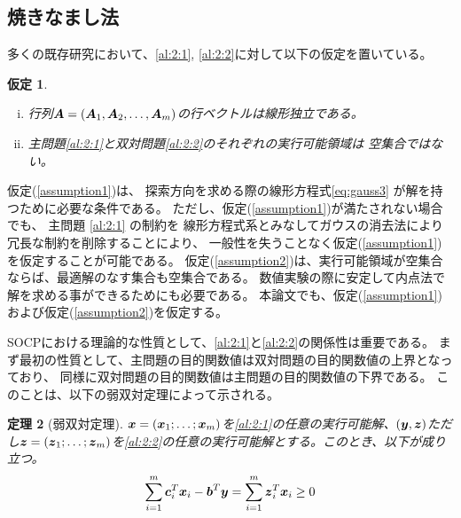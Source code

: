 \documentclass[11pt,a4paper,dvipdfmx,titlepage,uplatex]{jsarticle}
\theoremstyle{mystyle}
\newcommand{\0}{\mathbf{0}}
\newtheorem{theorem}{定理}
\newtheorem{assumption}[theorem]{仮定}
\def\b{\mbox{\boldmath $b$}}
\def\c{\mbox{\boldmath $c$}}
\def\x{\mbox{\boldmath $x$}}
\def\y{\mbox{\boldmath $y$}}
\def\z{\mbox{\boldmath $z$}}
\def\A{\mbox{\boldmath $A$}}
\begin{document}
\subsection{焼きなまし法}\label{sec:Second_Order_Cone_Programming:property}
多くの既存研究において、\eqref{al:2:1}, \eqref{al:2:2}に対して以下の仮定を置いている。
\begin{assumption}\label{assumption:SOCP}

\begin{enumerate}[(i)] \upshape
	\item 行列$\A = (\A_1 , \A_2 , \dots , \A_m)$の行ベクトルは線形独立である。\label{assumption1}
	\item 主問題\eqref{al:2:1}と双対問題\eqref{al:2:2}のそれぞれの実行可能領域は
	空集合ではない。\label{assumption2}
\end{enumerate}

\end{assumption}

仮定(\ref{assumption1})は、
探索方向を求める際の線形方程式\eqref{eq:gauss3}
が解を持つために必要な条件である。
ただし、仮定(\ref{assumption1})が満たされない場合でも、
主問題 \eqref{al:2:1} の制約を
線形方程式系とみなしてガウスの消去法により冗長な制約を削除することにより、
一般性を失うことなく仮定(\ref{assumption1})を仮定することが可能である。
仮定(\ref{assumption2})は、実行可能領域が空集合ならば、最適解のなす集合も空集合である。
数値実験の際に安定して内点法で解を求める事ができるためにも必要である。
本論文でも、仮定(\ref{assumption1})および仮定(\ref{assumption2})を仮定する。

SOCPにおける理論的な性質として、\eqref{al:2:1}と\eqref{al:2:2}の関係性は重要である。
まず最初の性質として、主問題の目的関数値は双対問題の目的関数値の上界となっており、
同様に双対問題の目的関数値は主問題の目的関数値の下界である。
このことは、以下の弱双対定理によって示される。

\begin{theorem}[弱双対定理]\label{theorem:weak-duality}
$\x = (\x_1; \dots ; \x_m)$を\eqref{al:2:1}の任意の実行可能解、$(\y,\z)$ただし$\z = (\z_1; \dots ; \z_m)$を\eqref{al:2:2}の任意の実行可能解とする。このとき、以下が成り立つ。
  \begin{align}
    \sum_{i=1}^m \c_i^T \x_i - \b^T \y = \sum_{i=1}^m \z_i^T \x_i \ge 0
  \end{align}
\end{theorem}
\end{document}
